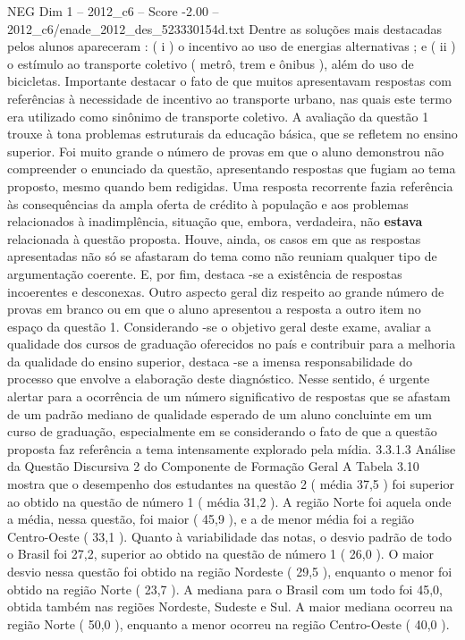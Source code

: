 \begin{textsample}{NEG Dim 1 – 2012\_c6 – Score -2.00 – 2012\_c6/enade\_2012\_des\_523330154d.txt}
Dentre as soluções mais destacadas pelos alunos apareceram : ( i ) o incentivo ao uso de energias alternativas ; e ( ii ) o estímulo ao transporte coletivo ( metrô, trem e ônibus ), além do uso de bicicletas.
Importante destacar o fato de que muitos apresentavam respostas com referências à necessidade de incentivo ao transporte urbano, nas quais este termo era utilizado como sinônimo de transporte coletivo.
A avaliação da questão 1 trouxe à tona problemas estruturais da educação básica, que se refletem no ensino superior.
Foi muito grande o número de provas em que o aluno demonstrou não compreender o enunciado da questão, apresentando respostas que fugiam ao tema proposto, mesmo quando bem redigidas.
Uma resposta recorrente fazia referência às consequências da ampla oferta de crédito à população e aos problemas relacionados à inadimplência, situação que, embora, verdadeira, não \textbf{estava} relacionada à questão proposta.
Houve, ainda, os casos em que as respostas apresentadas não só se afastaram do tema como não reuniam qualquer tipo de argumentação coerente.
E, por fim, destaca -se a existência de respostas incoerentes e desconexas.
Outro aspecto geral diz respeito ao grande número de provas em branco ou em que o aluno apresentou a resposta a outro item no espaço da questão 1.
Considerando -se o objetivo geral deste exame, avaliar a qualidade dos cursos de graduação oferecidos no país e contribuir para a melhoria da qualidade do ensino superior, destaca -se a imensa responsabilidade do processo que envolve a elaboração deste diagnóstico.
Nesse sentido, é urgente alertar para a ocorrência de um número significativo de respostas que se afastam de um padrão mediano de qualidade esperado de um aluno concluinte em um curso de graduação, especialmente em se considerando o fato de que a questão proposta faz referência a tema intensamente explorado pela mídia. 3.3.1.3 Análise da Questão Discursiva 2 do Componente de Formação Geral A Tabela 3.10 mostra que o desempenho dos estudantes na questão 2 ( média 37,5 ) foi superior ao obtido na questão de número 1 ( média 31,2 ).
A região Norte foi aquela onde a média, nessa questão, foi maior ( 45,9 ), e a de menor média foi a região Centro-Oeste ( 33,1 ).
Quanto à variabilidade das notas, o desvio padrão de todo o Brasil foi 27,2, superior ao obtido na questão de número 1 ( 26,0 ).
O maior desvio nessa questão foi obtido na região Nordeste ( 29,5 ), enquanto o menor foi obtido na região Norte ( 23,7 ).
A mediana para o Brasil com um todo foi 45,0, obtida também nas regiões Nordeste, Sudeste e Sul.
A maior mediana ocorreu na região Norte ( 50,0 ), enquanto a menor ocorreu na região Centro-Oeste ( 40,0 ).

\end{textsample}
